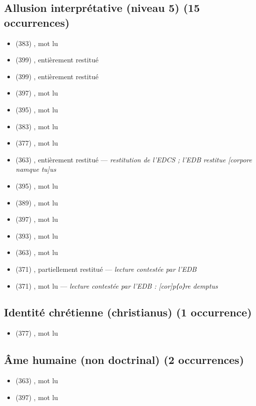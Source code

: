 \subsection*{Allusion interprétative (niveau 5) (15 occurrences)}
\begin{itemize}[leftmargin=1.2em,itemsep=0pt]
\item {} (383) , mot lu
\item {} (399) , entièrement restitué
\item {} (399) , entièrement restitué
\item {} (397) , mot lu
\item {} (395) , mot lu
\item {} (383) , mot lu
\item {} (377) , mot lu
\item {} (363) , entièrement restitué — \textit{restitution de l’EDCS ; l’EDB restitue [corpore namque tu]us}
\item {} (395) , mot lu
\item {} (389) , mot lu
\item {} (397) , mot lu
\item {} (393) , mot lu
\item {} (363) , mot lu
\item {} (371) , partiellement restitué — \textit{lecture contestée par l’EDB}
\item {} (371) , mot lu — \textit{lecture contestée par l’EDB : [cor]p⟨o⟩re demptus}
\end{itemize}
\subsection*{Identité chrétienne (christianus) (1 occurrence)}
\begin{itemize}[leftmargin=1.2em,itemsep=0pt]
\item {} (377) , mot lu
\end{itemize}
\subsection*{Âme humaine (non doctrinal) (2 occurrences)}
\begin{itemize}[leftmargin=1.2em,itemsep=0pt]
\item {} (363) , mot lu
\item {} (397) , mot lu
\end{itemize}
